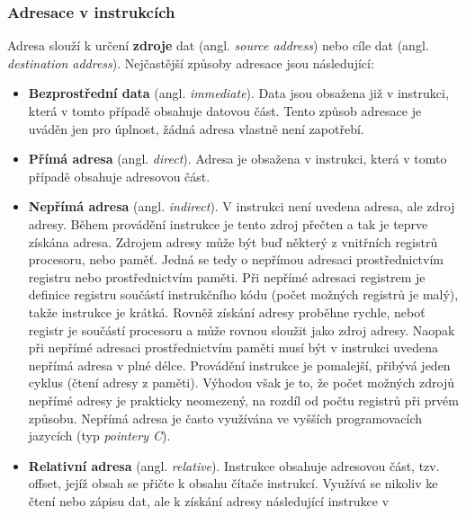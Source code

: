       \subsubsection{Adresace v instrukcích}
        Adresa slouží k určení \textbf{zdroje} dat (angl. \emph{source address}) nebo cíle dat 
        (angl. \emph{destination address}). Nejčastější způsoby adresace jsou následující:
        \begin{itemize}\addtolength{\itemsep}{-0.5\baselineskip}
          \item \textbf{Bezprostřední data} (angl. \emph{immediate}). Data jsou obsažena již v  
                instrukci, která v tomto případě obsahuje datovou část. Tento způsob adresace je 
                uváděn jen pro úplnost, žádná adresa vlastně není zapotřebí.
          \item \textbf{Přímá adresa} (angl. \emph{direct}). Adresa je obsažena v instrukci, která  
                v tomto případě obsahuje adresovou část.
          \item \textbf{Nepřímá adresa} (angl. \emph{indirect}). V instrukci není uvedena adresa,  
                ale zdroj adresy. Během provádění instrukce je tento zdroj přečten a tak je teprve 
                získána adresa. Zdrojem adresy může být buď některý z vnitřních registrů procesoru, 
                nebo paměť. Jedná se tedy o nepřímou adresaci prostřednictvím registru nebo 
                prostřednictvím paměti. Při nepřímé adresaci registrem je definice registru 
                součástí instrukčního kódu (počet možných registrů je malý), takže instrukce je 
                krátká. Rovněž získání adresy proběhne rychle, neboť registr je součástí procesoru 
                a může rovnou sloužit jako zdroj adresy. Naopak při nepřímé adresaci                
                prostřednictvím paměti musí být v instrukci uvedena nepřímá adresa v plné délce. 
                Provádění instrukce je pomalejší, přibývá jeden cyklus (čtení adresy z paměti). 
                Výhodou však je to, že počet možných zdrojů nepřímé adresy je prakticky neomezený, 
                na rozdíl od počtu registrů při prvém způsobu. Nepřímá adresa je často využívána ve 
                vyšších programovacích jazycích (typ \emph{pointery C}).
          \item \textbf{Relativní adresa} (angl. \emph{relative}). Instrukce obsahuje adresovou  
                část, tzv. offset, jejíž obsah se přičte k obsahu čítače instrukcí. Využívá se 
                nikoliv ke čtení nebo zápisu dat, ale k získání adresy následující instrukce v 

\end{itemize}
